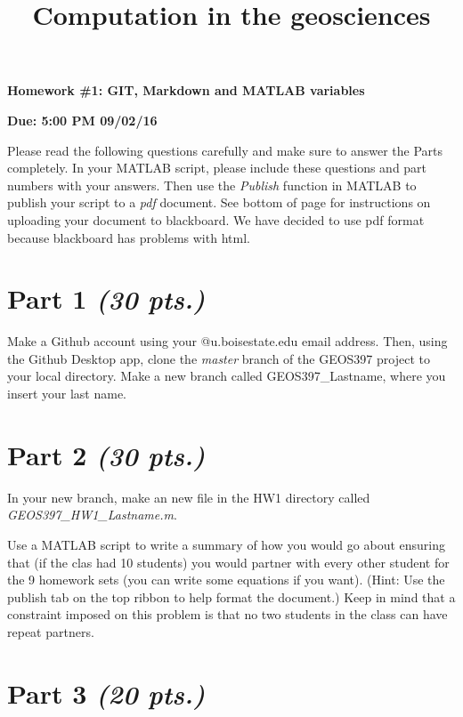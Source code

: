 \documentclass[10pt]{article}
\title{Computation in the geosciences}
\date{\empty}
\begin{document}
\begin{multicols}{2}
\begin{flushleft}
\textbf{Homework \#1: GIT, Markdown and MATLAB variables}
\end{flushleft}
\columnbreak 
\begin{flushright}
\textbf{Due: 5:00 PM 09/02/16}
\end{flushright}
\end{multicols}

Please read the following questions carefully and make sure to answer the Parts completely. In your MATLAB script, please include these questions and part numbers with your answers. Then use the \textit{Publish} function in MATLAB to publish your script to a \textit{pdf} document. See bottom of page for instructions on uploading your document to blackboard. We have decided to use pdf format because blackboard has problems with html.

\section*{Part 1 \textit{(30 pts.)}}

\noindent Make a Github account using your @u.boisestate.edu email address. Then, using the Github Desktop app, clone the \textit{master} branch of the GEOS397 project to your local directory. Make a new branch called GEOS397\_Lastname, where you insert your last name.

\section*{Part 2 \textit{(30 pts.)}}

\noindent In your new branch, make an new file in the HW1 directory called \textit{GEOS397\_HW1\_Lastname.m}. 

\noindent Use a MATLAB script to write a summary of how you would go about ensuring that (if the clas had 10 students) you would partner with every other student for the 9 homework sets (you can write some equations if you want). (Hint: Use the publish tab on the top ribbon to help format the document.) Keep in mind that a constraint imposed on this problem is that no two students in the class can have repeat partners.

\section*{Part 3 \textit{(20 pts.)}}
\end{document}
